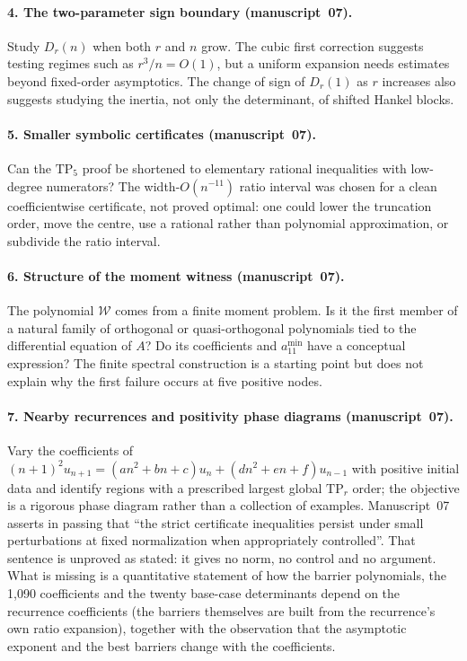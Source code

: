 \documentclass[11pt,letterpaper]{article}
\theoremstyle{remark}\newtheorem{remark}[theorem]{Remark}
\newcommand{\TP}{\mathrm{TP}}\newcommand{\TN}{\mathrm{TN}}
\newcounter{l7gtrsavedeq}
\begin{document}
\paragraph{4. The two-parameter sign boundary (manuscript~07).}
Study $D_r(n)$ when both $r$ and $n$ grow. The cubic first correction
suggests testing regimes such as $r^3/n=O(1)$, but a uniform expansion needs
estimates beyond fixed-order asymptotics. The change of sign of $D_r(1)$ as
$r$ increases also suggests studying the inertia, not only the determinant,
of shifted Hankel blocks.

\paragraph{5. Smaller symbolic certificates (manuscript~07).}
Can the $\TP_5$ proof be shortened to elementary rational inequalities with
low-degree numerators? The width-$O(n^{-11})$ ratio interval was chosen for
a clean coefficientwise certificate, not proved optimal: one could lower the
truncation order, move the centre, use a rational rather than polynomial
approximation, or subdivide the ratio interval.

\paragraph{6. Structure of the moment witness (manuscript~07).}
The polynomial $\mathcal W$ comes from a finite moment problem. Is it the
first member of a natural family of orthogonal or quasi-orthogonal
polynomials tied to the differential equation of $A$? Do its coefficients
and $a_{11}^{\min}$ have a conceptual expression? The finite spectral
construction is a starting point but does not explain why the first failure
occurs at five positive nodes.

\paragraph{7. Nearby recurrences and positivity phase diagrams (manuscript~07).}
Vary the coefficients of $(n+1)^2u_{n+1}=(an^2+bn+c)u_n+(dn^2+en+f)u_{n-1}$
with positive initial data and identify regions with a prescribed largest
global $\TP_r$ order; the objective is a rigorous phase diagram rather than
a collection of examples. Manuscript~07 asserts in passing that ``the strict
certificate inequalities persist under small perturbations at fixed
normalization when appropriately controlled''. That sentence is unproved as
stated: it gives no norm, no control and no argument. What is missing is a
quantitative statement of how the barrier polynomials, the 1{,}090
coefficients and the twenty base-case determinants depend on the
recurrence coefficients (the barriers themselves are built from the
recurrence's own ratio expansion), together with the observation that the
asymptotic exponent and the best barriers change with the coefficients.
\end{document}
